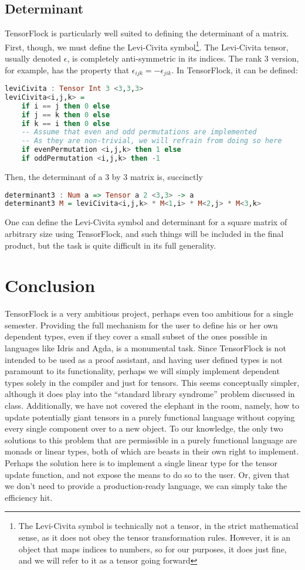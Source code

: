 \documentclass[12pt]{article}
\begin{document}
\subsection{Determinant}
TensorFlock is particularly well suited to defining the determinant of a matrix. First, though, we must define the Levi-Civita symbol\footnote{The Levi-Civita symbol is technically not a tensor, in the strict mathematical sense, as it does not obey the tensor transformation rules. However, it is an object that maps indices to numbers, so for our purposes, it does just fine, and we will refer to it as a tensor going forward}.
 The Levi-Civita tensor, usually denoted $\epsilon$, is completely anti-symmetric in its indices. The rank 3 version, for example, has the property that 
$\epsilon_{ijk} = -\epsilon_{jik}$. In TensorFlock, it can be defined:
\begin{lstlisting}[language=Haskell]
leviCivita : Tensor Int 3 <3,3,3>
leviCivita<i,j,k> = 
	if i == j then 0 else
	if j == k then 0 else
	if k == i then 0 else
	-- Assume that even and odd permutations are implemented
	-- As they are non-trivial, we will refrain from doing so here
	if evenPermutation <i,j,k> then 1 else
	if oddPermutation <i,j,k> then -1
\end{lstlisting}
Then, the determinant of a 3 by 3 matrix is, succinctly
\begin{lstlisting}[language=Haskell]
determinant3 : Num a => Tensor a 2 <3,3> -> a
determinant3 M = leviCivita<i,j,k> * M<1,i> * M<2,j> * M<3,k>
\end{lstlisting}
One can define the Levi-Civita symbol and determinant for a square matrix of arbitrary size using TensorFlock, and such things will be included in the final product, but the task is quite difficult in its full generality.
\section{Conclusion}
TensorFlock is a very ambitious project, perhaps even too ambitious for a single semester. Providing the full mechanism for the user to define his or her own dependent types, even if they cover a small subset of the ones possible in languages like Idris and Agda, is a monumental task. Since TensorFlock is not intended to be used as a proof assistant, and having user defined types is not paramount to its functionality, perhaps we will simply implement dependent types solely in the compiler and just for tensors. This seems conceptually simpler, although it does play into the ``standard library syndrome'' problem discussed in class. Additionally, we have not covered the elephant in the room, namely, how to update potentially giant tensors in a purely functional language without copying every single component over to a new object. To our knowledge, the only two solutions to this problem that are permissible in a purely functional language are monads or linear types, both of which are beasts in their own right to implement. Perhaps the solution here is to implement a single linear type for the tensor update function, and not expose the means to do so to the user. Or, given that we don't need to provide a production-ready language, we can simply take the efficiency hit.
\end{document}

